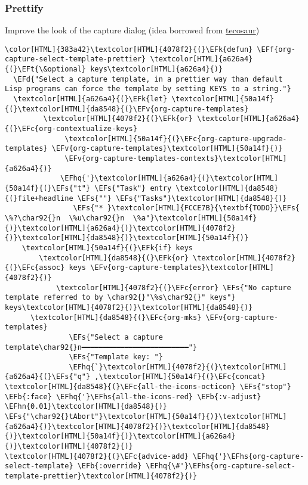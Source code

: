 \documentclass{scrartcl}
\newcommand{\EFk}[1]{\textcolor{EFk}{#1}} %
\newcommand{\EFd}[1]{\textcolor{EFd}{\textit{#1}}} %
\newcommand{\EFt}[1]{\textcolor{EFt}{#1}} %
\newcommand{\EFs}[1]{\textcolor{EFs}{#1}} %
\newcommand{\EFb}[1]{\textcolor{EFb}{#1}} %
\newcommand{\EFc}[1]{\textcolor{EFc}{#1}} %
\newcommand{\EFv}[1]{\textcolor{EFv}{#1}} %
\newcommand{\EFf}[1]{\textcolor{EFf}{#1}} %
\newcommand{\EFhn}[1]{\textcolor{EFhn}{\textbf{#1}}} %
\newcommand{\EFhq}[1]{\textcolor{EFhq}{#1}} %
\newcommand{\EFhs}[1]{\textcolor{EFhs}{#1}} %
\begin{document}
\subsubsection{Prettify}
\label{sec:org68432cf}
Improve the look of the capture dialog (idea borrowed from \href{https://github.com/tecosaur}{tecosaur})
\begin{Code}
\begin{Verbatim}[]
\color[HTML]{383a42}\textcolor[HTML]{4078f2}{(}\EFk{defun} \EFf{org-capture-select-template-prettier} \textcolor[HTML]{a626a4}{(}\EFt{\&optional} keys\textcolor[HTML]{a626a4}{)}
  \EFd{"Select a capture template, in a prettier way than default
Lisp programs can force the template by setting KEYS to a string."}
  \textcolor[HTML]{a626a4}{(}\EFk{let} \textcolor[HTML]{50a14f}{(}\textcolor[HTML]{da8548}{(}\EFv{org-capture-templates}
         \textcolor[HTML]{4078f2}{(}\EFk{or} \textcolor[HTML]{a626a4}{(}\EFc{org-contextualize-keys}
              \textcolor[HTML]{50a14f}{(}\EFc{org-capture-upgrade-templates} \EFv{org-capture-templates}\textcolor[HTML]{50a14f}{)}
              \EFv{org-capture-templates-contexts}\textcolor[HTML]{a626a4}{)}
             \EFhq{'}\textcolor[HTML]{a626a4}{(}\textcolor[HTML]{50a14f}{(}\EFs{"t"} \EFs{"Task"} entry \textcolor[HTML]{da8548}{(}file+headline \EFs{""} \EFs{"Tasks"}\textcolor[HTML]{da8548}{)}
                \EFs{"* }\textcolor[HTML]{FCCE7B}{\textbf{TODO}}\EFs{ \%?\char92{}n  \%u\char92{}n  \%a"}\textcolor[HTML]{50a14f}{)}\textcolor[HTML]{a626a4}{)}\textcolor[HTML]{4078f2}{)}\textcolor[HTML]{da8548}{)}\textcolor[HTML]{50a14f}{)}
    \textcolor[HTML]{50a14f}{(}\EFk{if} keys
        \textcolor[HTML]{da8548}{(}\EFk{or} \textcolor[HTML]{4078f2}{(}\EFc{assoc} keys \EFv{org-capture-templates}\textcolor[HTML]{4078f2}{)}
            \textcolor[HTML]{4078f2}{(}\EFc{error} \EFs{"No capture template referred to by \char92{}"\%s\char92{}" keys"} keys\textcolor[HTML]{4078f2}{)}\textcolor[HTML]{da8548}{)}
      \textcolor[HTML]{da8548}{(}\EFc{org-mks} \EFv{org-capture-templates}
               \EFs{"Select a capture template\char92{}n━━━━━━━━━━━━━━━━━━━━━━━━━"}
               \EFs{"Template key: "}
               \EFhq{`}\textcolor[HTML]{4078f2}{(}\textcolor[HTML]{a626a4}{(}\EFs{"q"} ,\textcolor[HTML]{50a14f}{(}\EFc{concat} \textcolor[HTML]{da8548}{(}\EFc{all-the-icons-octicon} \EFs{"stop"} \EFb{:face} \EFhq{'}\EFhs{all-the-icons-red} \EFb{:v-adjust} \EFhn{0.01}\textcolor[HTML]{da8548}{)} \EFs{"\char92{}tAbort"}\textcolor[HTML]{50a14f}{)}\textcolor[HTML]{a626a4}{)}\textcolor[HTML]{4078f2}{)}\textcolor[HTML]{da8548}{)}\textcolor[HTML]{50a14f}{)}\textcolor[HTML]{a626a4}{)}\textcolor[HTML]{4078f2}{)}
\textcolor[HTML]{4078f2}{(}\EFc{advice-add} \EFhq{'}\EFhs{org-capture-select-template} \EFb{:override} \EFhq{\#'}\EFhs{org-capture-select-template-prettier}\textcolor[HTML]{4078f2}{)}


\end{Verbatim}
\end{Code}
\end{document}
